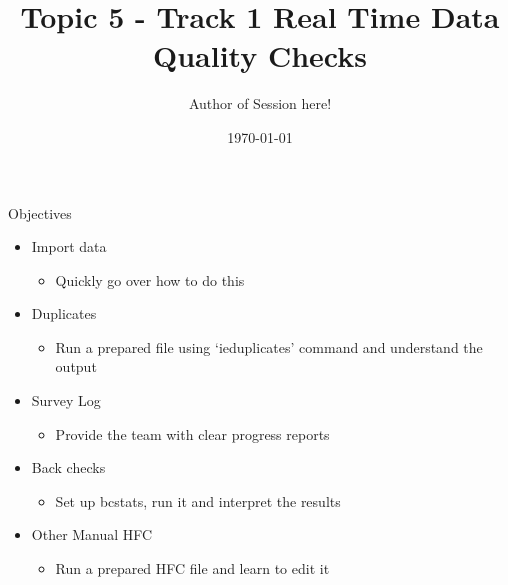 \documentclass[aspectratio=169]{beamer}
\title{Topic 5 - Track 1 \newline Real Time Data Quality Checks}
\date{\today}
\author{Author of Session here!} %
\institute{Development Impact Evaluation (DIME) \newline The World Bank }
\begin{document}
	
	{
		\maketitle
	}

\begin{frame}{Objectives}
	\begin{itemize}
		\item Import data
			\begin{itemize}
				\item Quickly go over how to do this
			\end{itemize}
		\item Duplicates
			\begin{itemize}
				\item Run a prepared file using ‘ieduplicates’ command and understand the output
			\end{itemize}
		\item Survey Log
			\begin{itemize}
				\item Provide the team with clear progress reports
			\end{itemize}
		\item Back checks 
			\begin{itemize}
				\item Set up bcstats, run it and interpret the results
			\end{itemize}
		\item Other Manual HFC
			\begin{itemize}
				\item Run a prepared HFC file and learn to edit it
			\end{itemize}
	\end{itemize}
\end{frame}
\end{document}
